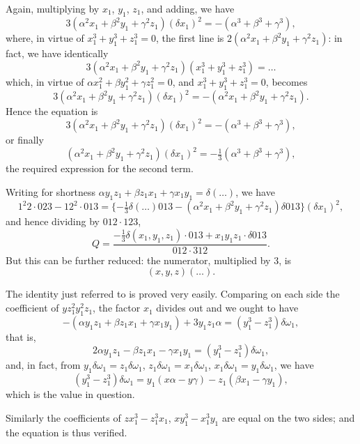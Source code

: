 \documentclass[11pt,a4paper]{book}
\begin{document}
\begin{art}\label{art:102}
Again, multiplying by $x_1$, $y_1$, $z_1$, and adding, we have
\[
3(\alpha^2 x_1 + \beta^2 y_1 + \gamma^2 z_1)(\delta x_1)^2 = -(\alpha^3 + \beta^3 + \gamma^3),
\]
where, in virtue of $x_1^3 + y_1^3 + z_1^3 = 0$, the first line is $2(\alpha^2 x_1 + \beta^2 y_1 + \gamma^2 z_1)$: in fact, we have identically
\[
3(\alpha^2 x_1 + \beta^2 y_1 + \gamma^2 z_1)(x_1^3 + y_1^3 + z_1^3) = \ldots
\]
which, in virtue of $\alpha x_1^2 + \beta y_1^2 + \gamma z_1^2 = 0$, and $x_1^3 + y_1^3 + z_1^3 = 0$, becomes
\[
3(\alpha^2 x_1 + \beta^2 y_1 + \gamma^2 z_1)(\delta x_1)^2 = -(\alpha^2 x_1 + \beta^2 y_1 + \gamma^2 z_1).
\]
Hence the equation is
\[
3(\alpha^2 x_1 + \beta^2 y_1 + \gamma^2 z_1)(\delta x_1)^2 = -(\alpha^3 + \beta^3 + \gamma^3),
\]
or finally
\[
(\alpha^2 x_1 + \beta^2 y_1 + \gamma^2 z_1)(\delta x_1)^2 = -\tfrac{1}{3}(\alpha^3 + \beta^3 + \gamma^3),
\]
the required expression for the second term.
\end{art}

\begin{art}\label{art:103}
Writing for shortness $\alpha y_1 z_1 + \beta z_1 x_1 + \gamma x_1 y_1 = \delta(\ldots)$, we have
\[
1^2 2 \cdot 023 - 12^2 \cdot 013 = \{-\tfrac{1}{3}\delta(\ldots)013 - (\alpha^2 x_1 + \beta^2 y_1 + \gamma^2 z_1)\delta 013\}(\delta x_1)^2,
\]
and hence dividing by $012 \cdot 123$,
\[
Q = \frac{-\frac{1}{3}\delta(x_1, y_1, z_1) \cdot 013 + x_1 y_1 z_1 \cdot \delta 013}{012 \cdot 312}.
\]
But this can be further reduced: the numerator, multiplied by $3$, is
\[
(x, y, z)(\ldots).
\]
\end{art}

\newpage
\begin{art}\label{art:104}
The identity just referred to is proved very easily. Comparing on each side the coefficient of $yz_1^2 y_1^2 z_1$, the factor $x_1$ divides out and we ought to have
\[
-(\alpha y_1 z_1 + \beta z_1 x_1 + \gamma x_1 y_1) + 3y_1 z_1 \alpha = (y_1^3 - z_1^3)\delta\omega_1,
\]
that is,
\[
2\alpha y_1 z_1 - \beta z_1 x_1 - \gamma x_1 y_1 = (y_1^3 - z_1^3)\delta\omega_1,
\]
and, in fact, from $y_1\delta\omega_1 = z_1\delta\omega_1$, $z_1\delta\omega_1 = x_1\delta\omega_1$, $x_1\delta\omega_1 = y_1\delta\omega_1$, we have
\[
(y_1^3 - z_1^3)\delta\omega_1 = y_1(x\alpha - y\gamma) - z_1(\beta x_1 - \gamma y_1),
\]
which is the value in question.

Similarly the coefficients of $zx_1^3 - z_1^3 x_1$, $xy_1^3 - x_1^3 y_1$ are equal on the two sides; and the equation is thus verified.
\end{art}
\end{document}
